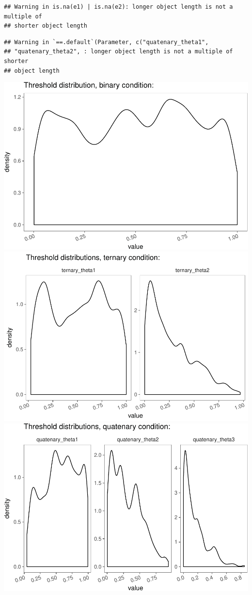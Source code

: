 \documentclass[floatsintext,man]{apa6}
\theoremstyle{definition}
\theoremstyle{definition}
\theoremstyle{definition}
\theoremstyle{remark}
\begin{document}
\begin{verbatim}
## Warning in is.na(e1) | is.na(e2): longer object length is not a multiple of
## shorter object length
\end{verbatim}

\begin{verbatim}
## Warning in `==.default`(Parameter, c("quatenary_theta1",
## "quatenary_theta2", : longer object length is not a multiple of shorter
## object length
\end{verbatim}

\includegraphics{writeup_files/figure-latex/unnamed-chunk-1-1.pdf}
\includegraphics{writeup_files/figure-latex/unnamed-chunk-1-2.pdf}
\includegraphics{writeup_files/figure-latex/unnamed-chunk-1-3.pdf}
\end{document}
